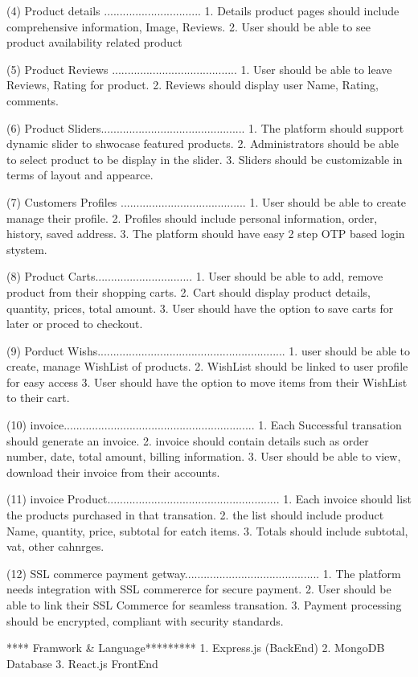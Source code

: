     (4) Product details ...............................
        1. Details product pages should include comprehensive information, Image, Reviews.
        2. User should be able to see product availability related product
    
    (5) Product Reviews ........................................
        1. User should be able to leave Reviews, Rating for product.
        2. Reviews should display user Name, Rating, comments.
    
    (6) Product Sliders..............................................
        1. The platform should support dynamic slider to shwocase featured products.
        2. Administrators should be able to select product to be display in the slider.
        3. Sliders should be customizable in terms of layout and appearce.
    
    (7) Customers Profiles ........................................
        1. User should be able to create manage their profile.
        2. Profiles should include personal information, order, history, saved address.
        3. The platform should have easy 2 step OTP based login stystem.
    
    (8) Product Carts...............................
        1. User should be able to add, remove product from their shopping carts.
        2. Cart should display product details, quantity, prices, total amount.
        3. User should have the option to save carts for later or proced to checkout.
    
    (9) Porduct Wishs............................................................
        1. user should be able to create, manage WishList of products.
        2. WishList should be linked to user profile for easy access
        3. User should have the option to move items from their WishList to their cart.
    
    (10) invoice.............................................................
         1. Each Successful transation should generate an invoice.
         2. invoice should contain details such as order number, date, total amount, billing information.
         3. User should be able to view, download their invoice from their accounts.
    
    (11) invoice Product.......................................................
         1. Each invoice should list the products purchased in that transation.
         2. the list should include product Name, quantity, price, subtotal for eatch items.
         3. Totals should include subtotal, vat, other cahnrges.
    
    (12) SSL commerce payment getway...........................................
         1. The platform needs integration with SSL commererce for secure payment.
         2. User should be able to link their SSL Commerce for seamless transation.
         3. Payment processing should be encrypted, compliant with security standards.
    
**** Framwork & Language*********
     1. Express.js (BackEnd)
     2. MongoDB Database
     3. React.js FrontEnd